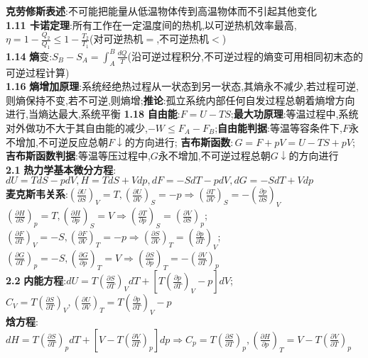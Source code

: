 \documentclass[10pt,a4paper]{article}
\begin{document}
\begin{multicols}{2}
\textbf{克劳修斯表述}:不可能把能量从低温物体传到高温物体而不引起其他变化\\
\textbf{1.11 卡诺定理}:所有工作在一定温度间的热机,以可逆热机效率最高,$\eta=1-\frac{Q_2}{Q_1}\leq1-\frac{T_2}{T_1}$(对可逆热机$=$,不可逆热机$<$)\\
\textbf{1.14}
\textbf{熵}变:$S_B-S_A=\int_A^B\frac{dQ}{T}$(沿可逆过程积分,不可逆过程的熵变可用相同初末态的可逆过程计算)\\
\textbf{1.16}
\textbf{熵增加原理}:系统经绝热过程从一状态到另一状态,其熵永不减少,若过程可逆,则熵保持不变,若不可逆,则熵增;\textbf{推论}:孤立系统内部任何自发过程总朝着熵增方向进行,当熵达最大,系统平衡\quad\quad
\textbf{1.18}
\textbf{自由能}:$F=U-TS$;\textbf{最大功原理}:等温过程中,系统对外做功不大于其自由能的减少,$-W\leq F_A-F_B$;\textbf{自由能判据}:等温等容条件下,$F$永不增加,不可逆反应总朝$F\downarrow$的方向进行;\quad
\textbf{吉布斯函数}$:G=F+pV=U-TS+pV$;\textbf{吉布斯函数判据}:等温等压过程中,$G$永不增加,不可逆过程总朝$G\downarrow$的方向进行\\
\textbf{2.1}
\textbf{热力学基本微分方程}:$dU=TdS-pdV,H=TdS+Vdp,dF=-SdT-pdV,dG=-SdT+Vdp$\\
\textbf{麦克斯韦关系}:$\left(\frac{\partial U}{\partial S}\right)_V=T,\left(\frac{\partial U}{\partial V}\right)_S=-p\Rightarrow\left(\frac{\partial T}{\partial V}\right)_S=-\left(\frac{\partial p}{\partial S}\right)_V$\\
$\left(\frac{\partial H}{\partial S}\right)_p=T,\left(\frac{\partial H}{\partial p}\right)_S=V\Rightarrow\left(\frac{\partial T}{\partial p}\right)_S=\left(\frac{\partial V}{\partial S}\right)_p$;\quad
$\left(\frac{\partial F}{\partial T}\right)_V=-S,\left(\frac{\partial F}{\partial V}\right)_T=-p\Rightarrow\left(\frac{\partial S}{\partial V}\right)_T=\left(\frac{\partial p}{\partial T}\right)_V$;\quad
$\left(\frac{\partial G}{\partial T}\right)_p=-S,\left(\frac{\partial G}{\partial p}\right)_T=V\Rightarrow\left(\frac{\partial S}{\partial p}\right)_T=-\left(\frac{\partial V}{\partial T}\right)_p$\\
\textbf{2.2}
\textbf{内能方程}:$dU=T\left(\frac{\partial S}{\partial T}\right)_VdT+\left[T\left(\frac{\partial p}{\partial T}\right)_V-p\right]dV$;$C_V=T\left(\frac{\partial S}{\partial T}\right)_V,\left(\frac{\partial U}{\partial V}\right)_T=T\left(\frac{\partial p}{\partial T}\right)_V-p$\\
\textbf{焓方程}:$dH=T\left(\frac{\partial S}{\partial T}\right)_pdT+\left[V-T\left(\frac{\partial V}{\partial T}\right)_p\right]dp\Rightarrow C_p=T\left(\frac{\partial S}{\partial T}\right)_p,\left(\frac{\partial H}{\partial p}\right)_T=V-T\left(\frac{\partial V}{\partial T}\right)_p$\\

\end{multicols}
\end{document}
